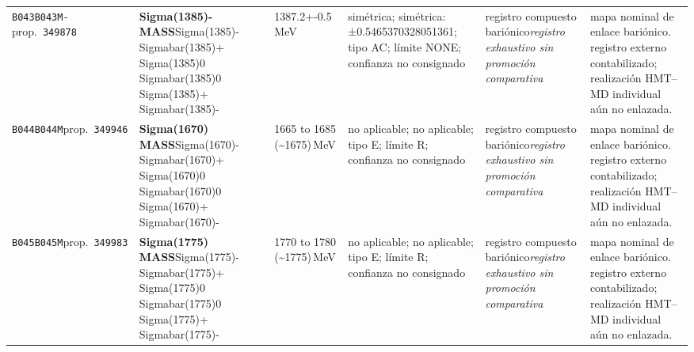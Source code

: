 \begin{landscape}
\begin{longtable}{L{1.85cm}L{4.45cm}L{2.35cm}L{4.05cm}L{3.35cm}L{7.15cm}}
\texttt{B043}\newline \texttt{B043M-}\newline prop.\ \texttt{349878} & \textbf{Sigma(1385)- MASS}\newline Sigma(1385)- \textbar{}\allowbreak{} Sigmabar(1385)+ \textbar{}\allowbreak{} Sigma(1385)0 \textbar{}\allowbreak{} Sigmabar(1385)0 \textbar{}\allowbreak{} Sigma(1385)+ \textbar{}\allowbreak{} Sigmabar(1385)- & 1387.2+-0.5\,MeV & simétrica; simétrica: ±0.5465370328051361; tipo AC; límite NONE; confianza no consignado & registro compuesto bariónico\newline \emph{registro exhaustivo sin promoción comparativa} & mapa nominal de enlace bariónico. registro externo contabilizado; realización HMT--MD individual aún no enlazada. \\
\texttt{B044}\newline \texttt{B044M}\newline prop.\ \texttt{349946} & \textbf{Sigma(1670) MASS}\newline Sigma(1670)- \textbar{}\allowbreak{} Sigmabar(1670)+ \textbar{}\allowbreak{} Sigma(1670)0 \textbar{}\allowbreak{} Sigmabar(1670)0 \textbar{}\allowbreak{} Sigma(1670)+ \textbar{}\allowbreak{} Sigmabar(1670)- & 1665 to 1685 (\textasciitilde{}1675)\,MeV & no aplicable; no aplicable; tipo E; límite R; confianza no consignado & registro compuesto bariónico\newline \emph{registro exhaustivo sin promoción comparativa} & mapa nominal de enlace bariónico. registro externo contabilizado; realización HMT--MD individual aún no enlazada. \\
\texttt{B045}\newline \texttt{B045M}\newline prop.\ \texttt{349983} & \textbf{Sigma(1775) MASS}\newline Sigma(1775)- \textbar{}\allowbreak{} Sigmabar(1775)+ \textbar{}\allowbreak{} Sigma(1775)0 \textbar{}\allowbreak{} Sigmabar(1775)0 \textbar{}\allowbreak{} Sigma(1775)+ \textbar{}\allowbreak{} Sigmabar(1775)- & 1770 to 1780 (\textasciitilde{}1775)\,MeV & no aplicable; no aplicable; tipo E; límite R; confianza no consignado & registro compuesto bariónico\newline \emph{registro exhaustivo sin promoción comparativa} & mapa nominal de enlace bariónico. registro externo contabilizado; realización HMT--MD individual aún no enlazada. \\

\end{longtable}
\end{landscape}
